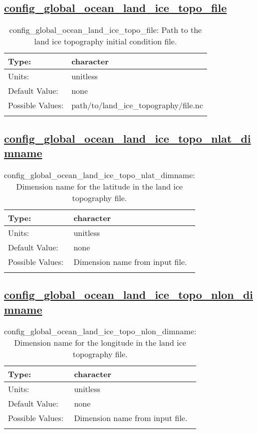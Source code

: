 \subsection[config\_global\_ocean\_land\_ice\_topo\_file]{\hyperref[sec:nm_tab_global_ocean]{config\_global\_ocean\_land\_ice\_topo\_file}}
\label{subsec:nm_sec_config_global_ocean_land_ice_topo_file}
\begin{center}
\begin{longtable}{| p{2.0in} || p{4.0in} |}
    \hline
    Type: & character \\
    \hline
    Units: & \si{unitless} \\
    \hline
    Default Value: & none \\
    \hline
    Possible Values: & path/to/land\_ice\_topography/file.nc \\
    \hline
    \caption{config\_global\_ocean\_land\_ice\_topo\_file: Path to the land ice topography initial condition file.}
\end{longtable}
\end{center}
\subsection[config\_global\_ocean\_land\_ice\_topo\_nlat\_dimname]{\hyperref[sec:nm_tab_global_ocean]{config\_global\_ocean\_land\_ice\_topo\_nlat\_dimname}}
\label{subsec:nm_sec_config_global_ocean_land_ice_topo_nlat_dimname}
\begin{center}
\begin{longtable}{| p{2.0in} || p{4.0in} |}
    \hline
    Type: & character \\
    \hline
    Units: & \si{unitless} \\
    \hline
    Default Value: & none \\
    \hline
    Possible Values: & Dimension name from input file. \\
    \hline
    \caption{config\_global\_ocean\_land\_ice\_topo\_nlat\_dimname: Dimension name for the latitude in the land ice topography file.}
\end{longtable}
\end{center}
\subsection[config\_global\_ocean\_land\_ice\_topo\_nlon\_dimname]{\hyperref[sec:nm_tab_global_ocean]{config\_global\_ocean\_land\_ice\_topo\_nlon\_dimname}}
\label{subsec:nm_sec_config_global_ocean_land_ice_topo_nlon_dimname}
\begin{center}
\begin{longtable}{| p{2.0in} || p{4.0in} |}
    \hline
    Type: & character \\
    \hline
    Units: & \si{unitless} \\
    \hline
    Default Value: & none \\
    \hline
    Possible Values: & Dimension name from input file. \\
    \hline
    \caption{config\_global\_ocean\_land\_ice\_topo\_nlon\_dimname: Dimension name for the longitude in the land ice topography file.}
\end{longtable}
\end{center}
